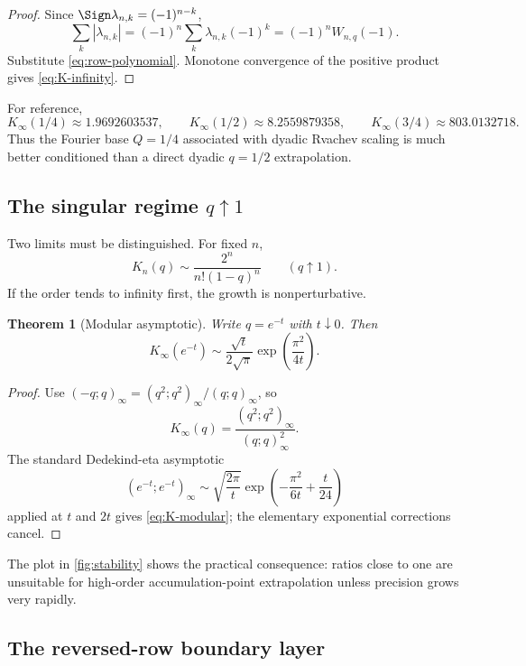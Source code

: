\documentclass[11pt,oneside]{article}
\numberwithin{equation}{section}
\newtheorem{theorem}{Theorem}[section]
\theoremstyle{definition}
\theoremstyle{remark}
\begin{document}
\begin{proof}
Since
$\Sign\lambda_{n,k}=(-1)^{n-k}$,
\[
 \sum_k|\lambda_{n,k}|=(-1)^n\sum_k\lambda_{n,k}(-1)^k
 =(-1)^nW_{n,q}(-1).
\]
Substitute \eqref{eq:row-polynomial}.  Monotone convergence of the positive
product gives \eqref{eq:K-infinity}.
\end{proof}

For reference,
\[
 K_\infty(1/4)\approx1.9692603537,
 \qquad K_\infty(1/2)\approx8.2559879358,
 \qquad K_\infty(3/4)\approx803.0132718.
\]
Thus the Fourier base $Q=1/4$ associated with dyadic Rvachev scaling is much
better conditioned than a direct dyadic $q=1/2$ extrapolation.

\subsection{The singular regime $q\uparrow1$}

Two limits must be distinguished.  For fixed $n$,
\begin{equation}
 K_n(q)\sim\frac{2^n}{n!(1-q)^n}
 \qquad(q\uparrow1).
 \label{eq:fixed-n-q1}
\end{equation}
If the order tends to infinity first, the growth is nonperturbative.

\begin{theorem}[Modular asymptotic]
Write $q=e^{-t}$ with $t\downarrow0$.  Then
\begin{equation}
 K_\infty(e^{-t})
 \sim\frac{\sqrt t}{2\sqrt\pi}
 \exp\!\left(\frac{\pi^2}{4t}\right).
 \label{eq:K-modular}
\end{equation}
\end{theorem}

\begin{proof}
Use
$(-q;q)_\infty=(q^2;q^2)_\infty/(q;q)_\infty$, so
\[
 K_\infty(q)=\frac{(q^2;q^2)_\infty}{(q;q)_\infty^2}.
\]
The standard Dedekind-eta asymptotic
\[
 (e^{-t};e^{-t})_\infty
 \sim\sqrt{\frac{2\pi}{t}}
 \exp\!\left(-\frac{\pi^2}{6t}+\frac{t}{24}\right)
\]
applied at $t$ and $2t$ gives \eqref{eq:K-modular}; the elementary exponential
corrections cancel.
\end{proof}

The plot in \cref{fig:stability} shows the practical consequence: ratios close
to one are unsuitable for high-order accumulation-point extrapolation unless
precision grows very rapidly.

\subsection{The reversed-row boundary layer}
\end{document}
